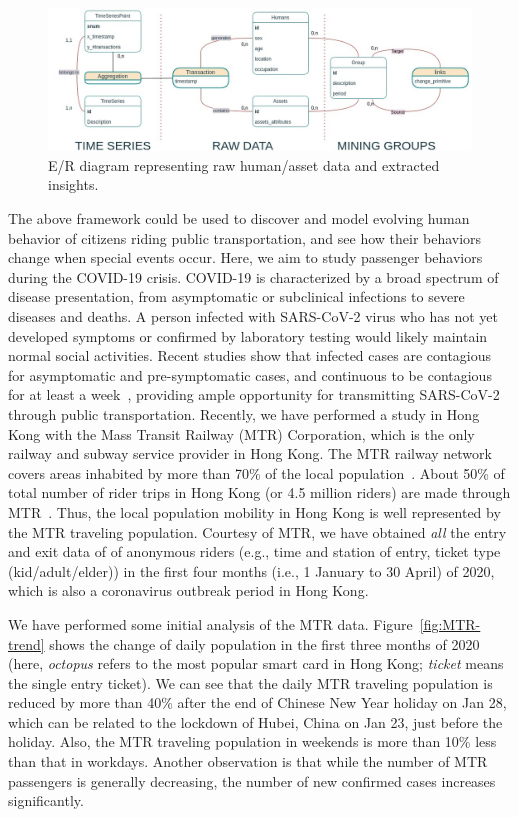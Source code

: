 \documentclass[11pt]{article}
\begin{document}
\begin{figure}[htpb]
    \centering
        \includegraphics[width=0.8\columnwidth]{submissions/reynold/figs/ER.jpg}
    \caption{E/R diagram representing raw human/asset data and extracted insights.}
    \label{fig:ER}
\end{figure}

The above framework could be used to discover and model evolving human behavior of citizens riding public transportation, and see how their behaviors change when special events occur. Here, we aim to study passenger behaviors during the COVID-19 crisis. COVID-19 is characterized by a broad spectrum of disease presentation, from asymptomatic or subclinical infections to severe diseases and deaths. A person infected with SARS-CoV-2 virus who has not yet developed symptoms or confirmed by laboratory testing would likely maintain normal social activities. Recent studies show that infected cases are contagious for asymptomatic and pre-symptomatic cases, and continuous to be contagious for at least a week~\cite{lau20, emery20}, providing ample opportunity for transmitting SARS-CoV-2 through public transportation. Recently, we have performed a study in Hong Kong with the Mass Transit Railway (MTR) Corporation, which is the only railway and subway service provider in Hong Kong.  The MTR railway network covers areas inhabited by more than 70\% of the local population~\cite{housing14}.  About 50\% of total number of rider trips in Hong Kong (or 4.5 million riders) are made through MTR~\cite{transport17}.  Thus, the local population mobility in Hong Kong is well represented by the MTR traveling population. Courtesy of MTR, we have obtained {\it all} the entry and exit data of of anonymous riders (e.g., time and station of entry, ticket type (kid/adult/elder)) in the first four months (i.e., 1 January to 30 April) of 2020, which is also a coronavirus outbreak period in Hong Kong. 

We have performed some initial analysis of the MTR data. Figure~\ref{fig:MTR-trend} shows the change of daily population in the first three months of 2020 (here, {\it octopus} refers to the most popular smart card in Hong Kong; {\it ticket} means the single entry ticket). We can see that the daily MTR traveling population is reduced by more than 40\% after the end of Chinese New Year holiday on Jan 28, which can be related to the lockdown of Hubei, China on Jan 23, just before the holiday. Also, the MTR traveling population in weekends is more than 10\% less than that in workdays. Another observation is that while the number of MTR passengers is generally decreasing, the number of new confirmed cases increases significantly.
\end{document}
